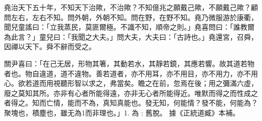 \begin{pinyinscope}
堯治天下五十年，不知天下治歟，不治歟？不知億兆之願戴己歟，不願戴己歟？顧問左右，左右不知。問外朝，外朝不知。問在野，在野不知。堯乃微服游於康衢，聞兒童謠曰：「立我蒸民，莫匪爾極。不識不知，順帝之則。」堯喜問曰：「誰教爾為此言？」童兒曰：「我聞之大夫。」問大夫，大夫曰：「古詩也。」堯還宮，召舜，因禪以天下。舜不辭而受之。

關尹喜曰：「在己无居，形物其箸，其動若水，其靜若鏡，其應若響。故其道若物者也。物自違道，道不違物。善若道者，亦不用耳，亦不用目，亦不用力，亦不用心。欲若道而用視聽形智以求之，弗當矣。瞻之在前，忽焉在後；用之彌滿六虛，廢之莫知其所。亦非有心者所能得遠，亦非无心者所能得近。唯默而得之而性成之者得之。知而亡情，能而不為，真知真能也。發无知，何能情？發不能，何能為？聚塊也，積塵也，雖无為1而非理也。」1. 為 : 舊脫。 據《正統道臧》本補。


\end{pinyinscope}